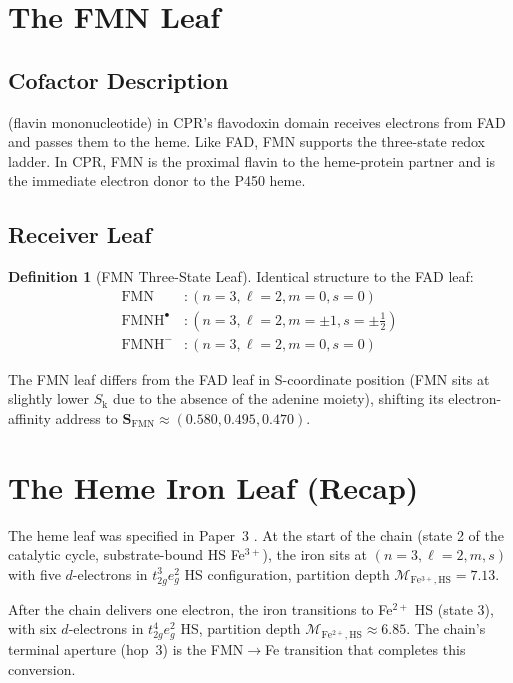 \documentclass[11pt,twocolumn,a4paper]{article}
\theoremstyle{definition}
\newtheorem{definition}[theorem]{Definition}
\theoremstyle{remark}
\newcommand{\Sk}{S_{\mathrm{k}}}
\newcommand{\Scoord}{\mathbf{S}}
\newcommand{\depth}{\mathcal{M}}
\begin{document}
\section{The FMN Leaf}
\label{sec:fmn_leaf}

\subsection{Cofactor Description}

 (flavin mononucleotide) in CPR's flavodoxin domain receives
electrons from FAD and passes them to the heme. Like FAD, FMN supports
the three-state redox ladder. In CPR, FMN is the proximal flavin to the
heme-protein partner and is the immediate electron donor to the P450 heme.

\subsection{Receiver Leaf}

\begin{definition}[FMN Three-State Leaf]
\label{def:fmn_leaf}
Identical structure to the FAD leaf:
\begin{align*}
\mathrm{FMN} &: (n=3, \ell=2, m=0, s=0) \\
\mathrm{FMNH}^\bullet &: (n=3, \ell=2, m=\pm 1, s=\pm\tfrac{1}{2}) \\
\mathrm{FMNH}^- &: (n=3, \ell=2, m=0, s=0)
\end{align*}
\end{definition}

The FMN leaf differs from the FAD leaf in S-coordinate position (FMN sits
at slightly lower $\Sk$ due to the absence of the adenine moiety),
shifting its electron-affinity address to $\Scoord_{\mathrm{FMN}}
\approx (0.580, 0.495, 0.470)$.

\section{The Heme Iron Leaf (Recap)}
\label{sec:heme_leaf}

The heme  leaf was specified in Paper~3 \citep{sachikonye2025_paper3}.
At the start of the chain (state 2 of the catalytic cycle, substrate-bound
HS Fe$^{3+}$), the iron sits at $(n=3, \ell=2, m, s)$ with five $d$-electrons
in $t_{2g}^3 e_g^2$ HS configuration, partition depth
$\depth_{\mathrm{Fe^{3+},HS}} = 7.13$.

After the chain delivers one electron, the iron transitions to Fe$^{2+}$ HS
(state 3), with six $d$-electrons in $t_{2g}^4 e_g^2$ HS, partition depth
$\depth_{\mathrm{Fe^{2+},HS}} \approx 6.85$. The chain's terminal aperture
(hop~3) is the FMN$\to$Fe transition that completes this conversion.
\end{document}
